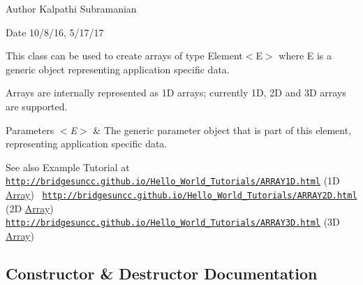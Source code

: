 \begin{DoxyAuthor}{Author}
Kalpathi Subramanian
\end{DoxyAuthor}
\begin{DoxyDate}{Date}
10/8/16, 5/17/17
\end{DoxyDate}
This class can be used to create arrays of type Element$<$\+E$>$ where E is a generic object representing application specific data.

Arrays are internally represented as 1D arrays; currently 1D, 2D and 3D arrays are supported.


\begin{DoxyParams}{Parameters}
{\em $<$\+E$>$} & The generic parameter object that is part of this element, representing application specific data.\\
\hline
\end{DoxyParams}
\begin{DoxySeeAlso}{See also}
Example Tutorial at ~\newline
 \href{http://bridgesuncc.github.io/Hello_World_Tutorials/ARRAY1D.html}{\tt http\+://bridgesuncc.\+github.\+io/\+Hello\+\_\+\+World\+\_\+\+Tutorials/\+A\+R\+R\+A\+Y1\+D.\+html} (1D \mbox{\hyperlink{class_bridges_1_1_array_1_1_array}{Array}})~\newline
 \href{http://bridgesuncc.github.io/Hello_World_Tutorials/ARRAY2D.html}{\tt http\+://bridgesuncc.\+github.\+io/\+Hello\+\_\+\+World\+\_\+\+Tutorials/\+A\+R\+R\+A\+Y2\+D.\+html} (2D \mbox{\hyperlink{class_bridges_1_1_array_1_1_array}{Array}})~\newline
 \href{http://bridgesuncc.github.io/Hello_World_Tutorials/ARRAY3D.html}{\tt http\+://bridgesuncc.\+github.\+io/\+Hello\+\_\+\+World\+\_\+\+Tutorials/\+A\+R\+R\+A\+Y3\+D.\+html} (3D \mbox{\hyperlink{class_bridges_1_1_array_1_1_array}{Array}}) 
\end{DoxySeeAlso}


\subsection{Constructor \& Destructor Documentation}
\mbox{\label{class_bridges_1_1_array_1_1_array_ad8e23399ea1e3f5bf4cbefdb5d9371be}} 
